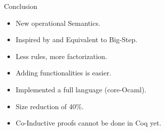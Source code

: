 \documentclass[page number,dvipsnames]{beamer}
\begin{document}
\begin{frame}{Conclusion}
  \begin{itemize}
  \item New operational Semantics.
  \item Inspired by and Equivalent to Big-Step.
  \item Less rules, more factorization.
  \item Adding functionalities is easier.
  \item Implemented a full language (core-Ocaml).
  \item Size reduction of 40\%.
  \item Co-Inductive proofs cannot be done in Coq yet.
  \end{itemize}
\end{frame}
\end{document}
